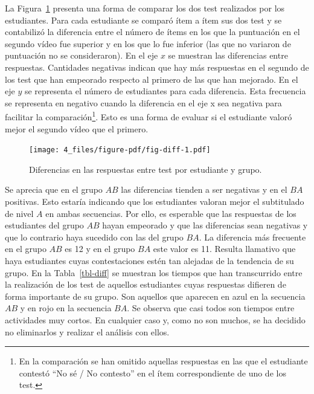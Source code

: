 \documentclass[
  12pt,
  a4paper,
  extrafontsizes,
  onecolumn,
  openright,
  table]{memoir}
\begin{document}
La Figura~\ref{fig-diff} presenta una forma de comparar los dos test
realizados por los estudiantes. Para cada estudiante se comparó ítem a
ítem sus dos test y se contabilizó la diferencia entre el número de
ítems en los que la puntuación en el segundo vídeo fue superior y en los
que lo fue inferior (las que no variaron de puntuación no se
consideraron). En el eje \(x\) se muestran las diferencias entre
respuestas. Cantidades negativas indican que hay más respuestas en el
segundo de los test que han empeorado respecto al primero de las que han
mejorado. En el eje \(y\) se representa el número de estudiantes para
cada diferencia. Esta frecuencia se representa en negativo cuando la
diferencia en el eje x sea negativa para facilitar la
comparación\footnote{En la comparación se han omitido aquellas
  respuestas en las que el estudiante contestó \enquote{No sé / No
  contesto} en el ítem correspondiente de uno de los test.}. Esto es una
forma de evaluar si el estudiante valoró mejor el segundo vídeo que el
primero.

\begin{figure}[h]

{\centering \texttt{[image: 4\_files/figure-pdf/fig-diff-1.pdf]}

}

\caption{\label{fig-diff}Diferencias en las respuestas entre test por
estudiante y grupo.}

\end{figure}

Se aprecia que en el grupo \(AB\) las diferencias tienden a ser
negativas y en el \(BA\) positivas. Esto estaría indicando que los
estudiantes valoran mejor el subtitulado de nivel \(A\) en ambas
secuencias. Por ello, es esperable que las respuestas de los estudiantes
del grupo \(AB\) hayan empeorado y que las diferencias sean negativas y
que lo contrario haya sucedido con las del grupo \(BA\). La diferencia
más frecuente en el grupo \(AB\) es 12 y en el grupo \(BA\) este valor
es 11. Resulta llamativo que haya estudiantes cuyas contestaciones estén
tan alejadas de la tendencia de su grupo. En la Tabla~\ref{tbl-diff} se
muestran los tiempos que han transcurrido entre la realización de los
test de aquellos estudiantes cuyas respuestas difieren de forma
importante de su grupo. Son aquellos que aparecen en azul en la
secuencia \(AB\) y en rojo en la secuencia \(BA\). Se observa que casi
todos son tiempos entre actividades muy cortos. En cualquier caso y,
como no son muchos, se ha decidido no eliminarlos y realizar el análisis
con ellos.
\end{document}
